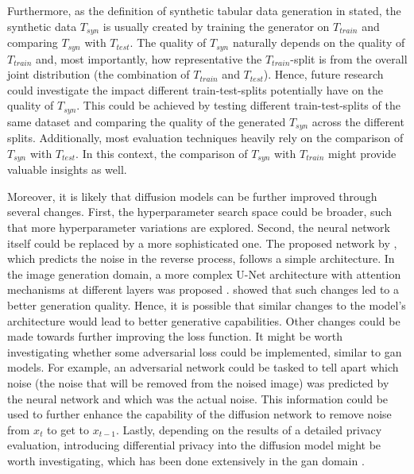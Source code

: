 Furthermore, as the definition of synthetic tabular data generation in  stated, the synthetic data $T_{syn}$ is usually created by training the generator on $T_{train}$ and comparing $T_{syn}$ with $T_{test}$.
The quality of $T_{syn}$ naturally depends on the quality of $T_{train}$ and, most importantly, how representative the $T_{train}$-split is from the overall joint distribution (the combination of $T_{train}$ and $T_{test}$).
Hence, future research could investigate the impact different train-test-splits potentially have on the quality of $T_{syn}$.
This could be achieved by testing different train-test-splits of the same dataset and comparing the quality of the generated $T_{syn}$ across the different splits.
Additionally, most evaluation techniques heavily rely on the comparison of $T_{syn}$ with $T_{test}$.
In this context, the comparison of $T_{syn}$ with $T_{train}$ might provide valuable insights as well.

Moreover, it is likely that diffusion models can be further improved through several changes.
First, the hyperparameter search space could be broader, such that more hyperparameter variations are explored.
Second, the neural network itself could be replaced by a more sophisticated one.
The proposed network by \cite{kotelnikov2022TabDDPMModellingTabular}, which predicts the noise in the reverse process, follows a simple architecture.
In the image generation domain, a more complex U-Net \cite{ronneberger2015UNetConvolutionalNetworks} architecture with attention mechanisms at different layers was proposed \cite{dhariwal2021DiffusionModelsBeat}.
\cite{dhariwal2021DiffusionModelsBeat} showed that such changes led to a better generation quality.
Hence, it is possible that similar changes to the model's architecture would lead to better generative capabilities.
Other changes could be made towards further improving the loss function.
It might be worth investigating whether some adversarial loss could be implemented, similar to \gls{gan} models.
For example, an adversarial network could be tasked to tell apart which noise (the noise that will be removed from the noised image) was predicted by the neural network and which was the actual noise.
This information could be used to further enhance the capability of the diffusion network to remove noise from $x_{t}$ to get to $x_{t-1}$.
Lastly, depending on the results of a detailed privacy evaluation, introducing differential privacy \cite{dwork2011DifferentialPrivacy} into the diffusion model might be worth investigating, which has been done extensively in the \gls{gan} domain \cite{jordon2018PATEGANGeneratingSynthetic,9054559, kunar2021DTGANDifferentialPrivatea, torfi2022DifferentiallyPrivateSynthetic}.

